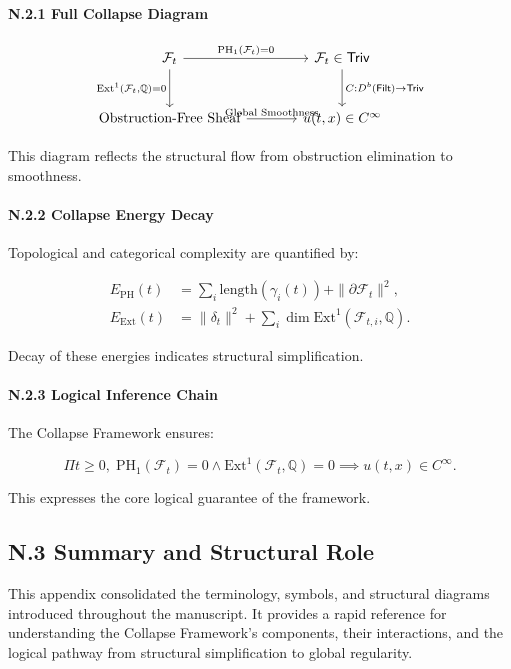 \documentclass[11pt]{article}
\begin{document}
\paragraph{N.2.1 Full Collapse Diagram}

\[
\begin{tikzcd}[row sep=large, column sep=large]
\mathcal{F}_t
  \arrow[r, "{\mathrm{PH}_1(\mathcal{F}_t) = 0}"]
  \arrow[d, "{\mathrm{Ext}^1(\mathcal{F}_t, \mathbb{Q}) = 0}"']
& \mathcal{F}_t \in \mathsf{Triv}
  \arrow[d, "{C : D^b(\mathsf{Filt}) \to \mathsf{Triv}}"] \\
\text{Obstruction-Free Sheaf}
  \arrow[r, "{\text{Global Smoothness}}"]
& u(t, x) \in C^\infty
\end{tikzcd}
\]

This diagram reflects the structural flow from obstruction elimination to smoothness.

\paragraph{N.2.2 Collapse Energy Decay}

Topological and categorical complexity are quantified by:

\[
\begin{aligned}
E_{\mathrm{PH}}(t) &= \sum_i \mathrm{length}(\gamma_i(t)) + \|\partial \mathcal{F}_t\|^2, \\
E_{\mathrm{Ext}}(t) &= \|\delta_t\|^2 + \sum_i \dim \mathrm{Ext}^1(\mathcal{F}_{t,i}, \mathbb{Q}).
\end{aligned}
\]

Decay of these energies indicates structural simplification.

\paragraph{N.2.3 Logical Inference Chain}

The Collapse Framework ensures:

\[
\Pi t \geq 0,\;
\mathrm{PH}_1(\mathcal{F}_t) = 0 \land \mathrm{Ext}^1(\mathcal{F}_t, \mathbb{Q}) = 0
\implies u(t, x) \in C^\infty.
\]

This expresses the core logical guarantee of the framework.

\subsection*{N.3 Summary and Structural Role}

This appendix consolidated the terminology, symbols, and structural diagrams introduced throughout the manuscript.  
It provides a rapid reference for understanding the Collapse Framework's components, their interactions, and the logical pathway from structural simplification to global regularity.
\end{document}
